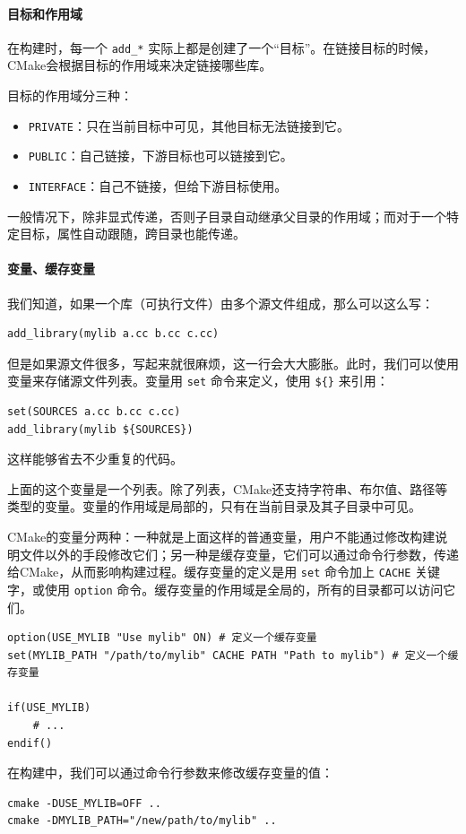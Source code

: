 \paragraph{目标和作用域} 在构建时，每一个 \verb|add_*| 实际上都是创建了一个“目标”。在链接目标的时候，CMake会根据目标的作用域来决定链接哪些库。

目标的作用域分三种：
\begin{itemize}
    \item \verb|PRIVATE|：只在当前目标中可见，其他目标无法链接到它。
    \item \verb|PUBLIC|：自己链接，下游目标也可以链接到它。
    \item \verb|INTERFACE|：自己不链接，但给下游目标使用。
\end{itemize}

一般情况下，除非显式传递，否则子目录自动继承父目录的作用域；而对于一个特定目标，属性自动跟随，跨目录也能传递。

\paragraph{变量、缓存变量} 我们知道，如果一个库（可执行文件）由多个源文件组成，那么可以这么写：
\begin{verbatim}
add_library(mylib a.cc b.cc c.cc)
\end{verbatim}
但是如果源文件很多，写起来就很麻烦，这一行会大大膨胀。此时，我们可以使用变量来存储源文件列表。变量用 \verb|set| 命令来定义，使用 \verb|${}| 来引用：
\begin{verbatim}
set(SOURCES a.cc b.cc c.cc)
add_library(mylib ${SOURCES})
\end{verbatim}
这样能够省去不少重复的代码。

上面的这个变量是一个列表。除了列表，CMake还支持字符串、布尔值、路径等类型的变量。变量的作用域是局部的，只有在当前目录及其子目录中可见。

CMake的变量分两种：一种就是上面这样的普通变量，用户不能通过修改构建说明文件以外的手段修改它们；另一种是缓存变量，它们可以通过命令行参数，传递给CMake，从而影响构建过程。缓存变量的定义是用 \verb|set| 命令加上 \verb|CACHE| 关键字，或使用 \verb|option| 命令。缓存变量的作用域是全局的，所有的目录都可以访问它们。
\begin{verbatim}
option(USE_MYLIB "Use mylib" ON) # 定义一个缓存变量
set(MYLIB_PATH "/path/to/mylib" CACHE PATH "Path to mylib") # 定义一个缓存变量

if(USE_MYLIB)
    # ...
endif()
\end{verbatim}
在构建中，我们可以通过命令行参数来修改缓存变量的值：
\begin{verbatim}
cmake -DUSE_MYLIB=OFF ..
cmake -DMYLIB_PATH="/new/path/to/mylib" ..
\end{verbatim}

